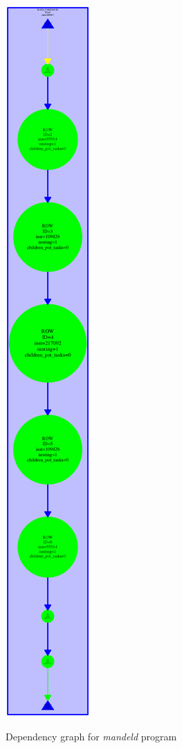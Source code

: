 \documentclass[12]{article}
\begin{document}
\begin{figure}[H]
\centering
\includegraphics[scale=0.2]{images/dependency_graph_Mandeld.png}
\label{graphic}
\caption{Dependency graph for \textit{mandeld} program}
\end{figure}
\end{document}
